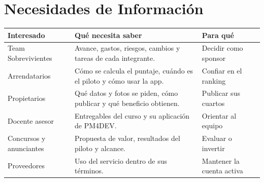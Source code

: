 \documentclass[11pt,a4paper]{article}
\begin{document}
\section{Necesidades de Información}
{\small
{}
\noindent\begin{tabularx}{\textwidth}{@{}P{3.6cm} L P{3.4cm}@{}}
\toprule
{}
\textbf{Interesado} & \textbf{Qué necesita saber} & \textbf{Para qué} \\
\midrule
Team Sobrevivientes & Avance, gastos, riesgos, cambios y tareas de cada integrante. & Decidir como sponsor \\
Arrendatarios & Cómo se calcula el puntaje, cuándo es el piloto y cómo usar la app. & Confiar en el ranking \\
Propietarios & Qué datos y fotos se piden, cómo publicar y qué beneficio obtienen. & Publicar sus cuartos \\
Docente asesor & Entregables del curso y su aplicación de PM4DEV. & Orientar al equipo \\
Concursos y anunciantes & Propuesta de valor, resultados del piloto y alcance. & Evaluar o invertir \\
Proveedores & Uso del servicio dentro de sus términos. & Mantener la cuenta activa \\
\bottomrule
\end{tabularx}
}
\end{document}
